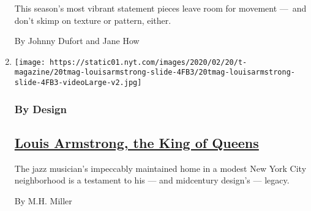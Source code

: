 \begin{enumerate}
  This season's most vibrant statement pieces leave room for movement
  ---~and don't skimp on texture or pattern, either.

  By Johnny Dufort and Jane How
\item
  \texttt{[image: https://static01.nyt.com/images/2020/02/20/t-magazine/20tmag-louisarmstrong-slide-4FB3/20tmag-louisarmstrong-slide-4FB3-videoLarge-v2.jpg]}

  \hypertarget{by-design}{%
  \subsubsection{By Design}\label{by-design}}

  \hypertarget{louis-armstrong-the-king-of-queens}{%
  \subsection{\texorpdfstring{\href{/2020/02/20/t-magazine/louis-armstrong-home-queens.html}{Louis
  Armstrong, the King of
  Queens}}{Louis Armstrong, the King of Queens}}\label{louis-armstrong-the-king-of-queens}}

  The jazz musician's impeccably maintained home in a modest New York
  City neighborhood is a testament to his --- and midcentury design's
  --- legacy.

  By M.H. Miller
\end{enumerate}

